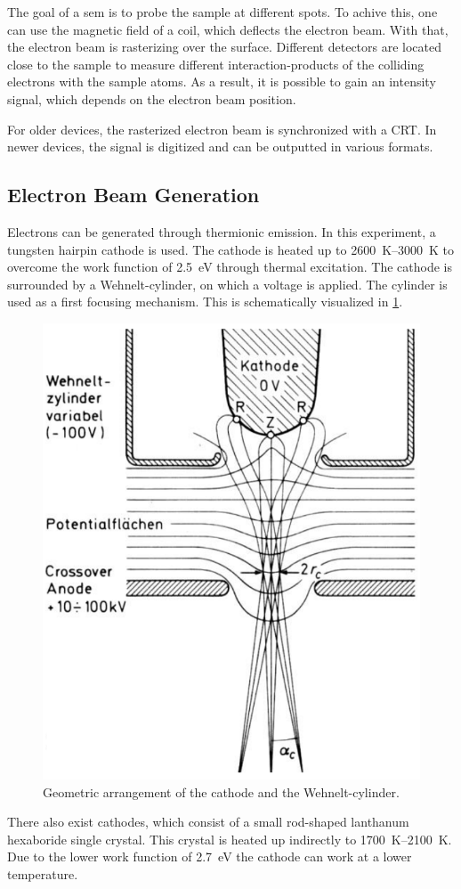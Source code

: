 The goal of a \ac{sem} is to probe the sample at different spots.
To achive this, one can use the magnetic field of a coil, which deflects
the electron beam. 
With that, the electron beam is rasterizing over the surface. 
Different detectors are located close to the sample to measure different 
interaction-products of the colliding electrons with the sample atoms. 
As a result, it is possible to gain an intensity signal, which
depends on the electron beam position.


For older devices, the rasterized electron beam is synchronized
with a CRT. 
In newer devices, the signal is digitized and can be outputted in
various formats. 

\subsection{Electron Beam Generation}
Electrons can be generated through thermionic emission.
In this experiment, a tungsten hairpin cathode is used.
The cathode is heated up to \qtyrange{2600}{3000}{\kelvin} to overcome
the work function of \qty{2.5}{\electronvolt} through thermal 
excitation.
The cathode is surrounded by a Wehnelt-cylinder, on which a voltage is 
applied.
The cylinder is used as a first focusing mechanism.
This is schematically visualized in \cref{fig:wolfram}. 
\begin{figure}
	\centering
	\includegraphics[width=0.95\linewidth]{../assets/wolfram.png}
	\caption{Geometric arrangement of the cathode and the Wehnelt-cylinder.
	}
	\label{fig:wolfram}
\end{figure}
There also exist  cathodes, which consist of a small rod-shaped
lanthanum hexaboride single crystal. 
This crystal is heated up indirectly to \qtyrange{1700}{2100}{\kelvin}.
Due to the lower work function of \qty{2.7}{\electronvolt} the cathode
can work at a lower temperature. 

